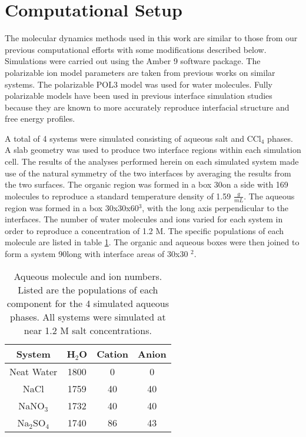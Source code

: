 \section{Computational Setup}

The molecular dynamics methods used in this work are similar to those from our previous computational efforts with some modifications described below.\cite{Hore2008,Walker2006b,Hore2007} Simulations were carried out using the Amber 9 software package. The polarizable ion model parameters are taken from previous works on similar systems.\cite{Chang1997a,Dang1999,Thomas2007,Hrobarik2006,Chang1995} The polarizable POL3 model was used for water molecules.\cite{Caldwell1995} Fully polarizable models have been used in previous interface simulation studies because they are known to more accurately reproduce interfacial structure and free energy profiles.\cite{Rivera2006,Wick2007,Petersen2005b,Salvador2003,Dang1998}

A total of 4 systems were simulated consisting of aqueous salt and CCl$_4$ phases. A slab geometry was used to produce two interface regions within each simulation cell.\cite{Hore2007}  The results of the analyses performed herein on each simulated system made use of the natural symmetry of the two interfaces by averaging the results from the two surfaces. The organic region was formed in a box 30\angs on a side with 169 \ctc molecules to reproduce a standard temperature density of 1.59 $\frac{g}{mL}$. The aqueous region was formed in a box 30x30x60\angs$^3$, with the long axis perpendicular to the interfaces. The number of water molecules and ions varied for each system in order to reproduce a concentration of 1.2 M. The specific populations of each molecule are listed in table \ref{densities}. The organic and aqueous boxes were then joined to form a system 90\angs long with interface areas of 30x30 \angs$^2$.

\begin{table}[htdp]
	\begin{center}
	\begin{tabular}{|c||c|c|c|}
		\hline
		System & H$_2$O & Cation & Anion \\ \hline
		Neat Water & 1800 & 0 & 0 \\ 
		NaCl & 1759 & 40 & 40 \\
		NaNO$_3$ & 1732 & 40 & 40 \\
		Na$_2$SO$_4$ & 1740 & 86 & 43 \\
		\hline
	\end{tabular}
	\end{center}
	\label{densities}
	\caption{Aqueous molecule and ion numbers. Listed are the populations of each component for the 4 simulated aqueous phases. All systems were simulated at near 1.2 M salt concentrations.}
\end{table}

